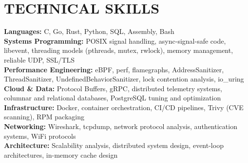 \documentclass[10pt,letterpaper]{article}
\begin{document}
\section{TECHNICAL SKILLS}
\noindent\textbf{Languages:} C, Go, Rust, Python, SQL, Assembly, Bash\\
\noindent\textbf{Systems Programming:} POSIX signal handling, async-signal-safe code, libevent, threading models (pthreads, mutex, rwlock), memory management, reliable UDP, SSL/TLS\\
\noindent\textbf{Performance Engineering:} eBPF, perf, flamegraphs, AddressSanitizer, ThreadSanitizer, UndefinedBehaviorSanitizer, lock contention analysis, io\_uring\\
\noindent\textbf{Cloud \& Data:} Protocol Buffers, gRPC, distributed telemetry systems, columnar and relational databases, PostgreSQL tuning and optimization\\
\noindent\textbf{Infrastructure:} Docker, container orchestration, CI/CD pipelines, Trivy (CVE scanning), RPM packaging\\
\noindent\textbf{Networking:} Wireshark, tcpdump, network protocol analysis, authentication systems, WiFi protocols\\
\noindent\textbf{Architecture:} Scalability analysis, distributed system design, event-loop architectures, in-memory cache design
\end{document}
